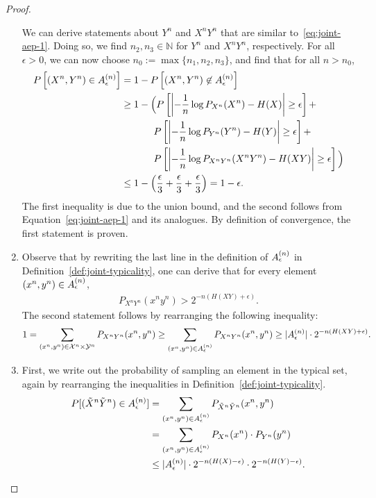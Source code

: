 \begin{proof}
\begin{enumerate}
We can derive statements about $Y^n$ and $X^nY^n$ that are similar to~\eqref{eq:joint-aep-1}. Doing so, we find $n_2, n_3 \in \mathbb{N}$ for $Y^n$ and $X^nY^n$, respectively. For all $\epsilon > 0$, we can now choose $n_0 := \max\{n_1,n_2,n_3\}$, and find that for all $n > n_0$,
\begin{align}
P\left[(X^n,Y^n) \in A_{\epsilon}^{(n)}\right] &= 1 - P\left[(X^n,Y^n) \not\in A_{\epsilon}^{(n)}\right]\nonumber\\
&\geq 1 - \Big( P\left[\left|-\frac{1}{n} \log P_{X^n}(X^n) - H(X)\right| \geq \epsilon \right] + \nonumber\\
&\phantom{\geq 1 - \Big(}P\left[\left|-\frac{1}{n} \log P_{Y^n}(Y^n) - H(Y)\right| \geq \epsilon \right] + \nonumber\\
&\phantom{\geq 1 - \Big(}P\left[\left|-\frac{1}{n} \log P_{X^nY^n}(X^nY^n) - H(XY)\right| \geq \epsilon \right]\Big)\nonumber\\
&\leq 1 - \left(\frac{\epsilon}{3} + \frac{\epsilon}{3} + \frac{\epsilon}{3}\right) = 1 - \epsilon.
\end{align}
The first inequality is due to the union bound, and the second follows from Equation~\eqref{eq:joint-aep-1} and its analogues. By definition of convergence, the first statement is proven.
\item Observe that by rewriting the last line in the definition of $A_{\epsilon}^{(n)}$ in Definition~\ref{def:joint-typicality}, one can derive that for every element $(x^n,y^n) \in A_{\epsilon}^{(n)}$,
\begin{align}
P_{X^nY^n}(x^ny^n) > 2^{-n(H(XY) + \epsilon)}.
\end{align}
The second statement follows by rearranging the following inequality:
\begin{align}
1 = \sum_{(x^n,y^n) \in \mathcal{X}^n \times \mathcal{Y}^n} P_{X^nY^n}(x^n,y^n) \geq \sum_{(x^n,y^n) \in A_{\epsilon}^{(n)}} P_{X^nY^n}(x^n,y^n) \geq |A_{\epsilon}^{(n)}| \cdot 2^{-n(H(XY) + \epsilon)}.
\end{align}
\item First, we write out the probability of sampling an element in the typical set, again by rearranging the inequalities in Definition~\ref{def:joint-typicality}.
\begin{align}
P[(\tilde{X}^n\tilde{Y}^n) \in \typset] &= \sum_{(x^n,y^n) \in \typset} P_{\tilde{X}^n\tilde{Y}^n}(x^n,y^n)\nonumber\\
&= \sum_{(x^n,y^n) \in \typset} P_{X^n}(x^n) \cdot P_{Y^n}(y^n)\nonumber\\
&\leq |\typset|\cdot 2^{-n(H(X) - \epsilon)} \cdot 2^{-n(H(Y)-\epsilon)}.

\end{align}
\end{enumerate}
\end{proof}
